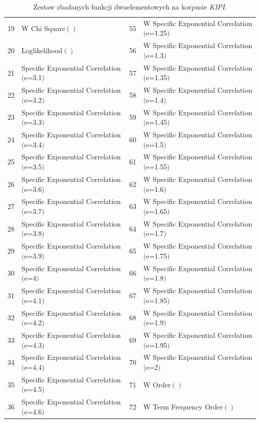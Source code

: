 \documentclass[11pt,a4paper]{llncs}
\begin{document}
\begin{table}[h!]
\begin{tabular}{ l | l || l | l }
	19	&	W Chi Square$()$								& 55	&	W Specific Exponential Correlation$($e=1.25$)$	\\
	20	&	Loglikelihood$()$								& 56	&	W Specific Exponential Correlation$($e=1.3$)$	\\
	21	&	Specific Exponential Correlation$($e=3.1$)$		& 57	&	W Specific Exponential Correlation$($e=1.35$)$	\\
	22	&	Specific Exponential Correlation$($e=3.2$)$		& 58	&	W Specific Exponential Correlation$($e=1.4$)$	\\
	23	&	Specific Exponential Correlation$($e=3.3$)$		& 59	&	W Specific Exponential Correlation$($e=1.45$)$	\\
	24	&	Specific Exponential Correlation$($e=3.4$)$		& 60	&	W Specific Exponential Correlation$($e=1.5$)$	\\
	25	&	Specific Exponential Correlation$($e=3.5$)$		& 61	&	W Specific Exponential Correlation$($e=1.55$)$	\\
	26	&	Specific Exponential Correlation$($e=3.6$)$		& 62	&	W Specific Exponential Correlation$($e=1.6$)$	\\
	27	&	Specific Exponential Correlation$($e=3.7$)$		& 63	&	W Specific Exponential Correlation$($e=1.65$)$	\\
	28	&	Specific Exponential Correlation$($e=3.8$)$		& 64	&	W Specific Exponential Correlation$($e=1.7$)$	\\
	29	&	Specific Exponential Correlation$($e=3.9$)$		& 65	&	W Specific Exponential Correlation$($e=1.75$)$	\\
	30	&	Specific Exponential Correlation$($e=4$)$		& 66	&	W Specific Exponential Correlation$($e=1.8$)$	\\
	31	&	Specific Exponential Correlation$($e=4.1$)$		& 67	&	W Specific Exponential Correlation$($e=1.85$)$	\\
	32	&	Specific Exponential Correlation$($e=4.2$)$		& 68	&	W Specific Exponential Correlation$($e=1.9$)$	\\
	33	&	Specific Exponential Correlation$($e=4.3$)$		& 69	&	W Specific Exponential Correlation$($e=1.95$)$	\\
	34	&	Specific Exponential Correlation$($e=4.4$)$		& 70	&	W Specific Exponential Correlation$($e=2$)$		\\
	35	&	Specific Exponential Correlation$($e=4.5$)$		& 71	&	W Order$()$										\\
	36	&	Specific Exponential Correlation$($e=4.6$)$		& 72	&	W Term Frequency Order$()$						\\
	\bottomrule
\end{tabular}
\caption[Zestaw zbadanych funkcji dwuelementowych na korpusie \emph{KIPI}]{Zestaw zbadanych funkcji dwuelementowych na korpusie \emph{KIPI}.}
\label{KIPI_2_function_set}
\end{table}
\end{document}
